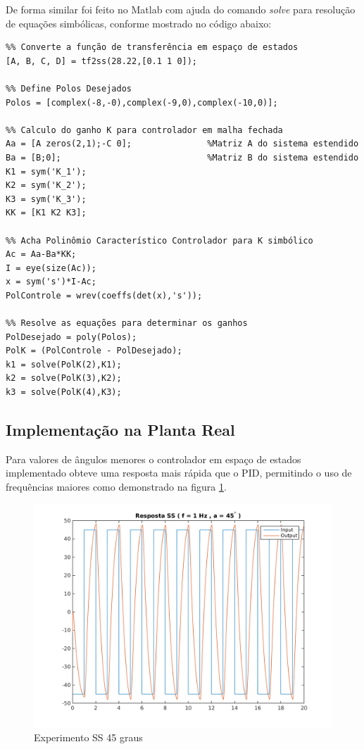 \documentclass[a4paper,11pt]{article}
\begin{document}
De forma similar foi feito no Matlab com ajuda do comando \textit{solve} para resolução de equações simbólicas, conforme mostrado no código abaixo:

\begin{verbatim}
%% Converte a função de transferência em espaço de estados 
[A, B, C, D] = tf2ss(28.22,[0.1 1 0]);

%% Define Polos Desejados
Polos = [complex(-8,-0),complex(-9,0),complex(-10,0)];

%% Calculo do ganho K para controlador em malha fechada 
Aa = [A zeros(2,1);-C 0];               %Matriz A do sistema estendido
Ba = [B;0];                             %Matriz B do sistema estendido
K1 = sym('K_1');
K2 = sym('K_2');
K3 = sym('K_3');
KK = [K1 K2 K3];

%% Acha Polinômio Característico Controlador para K simbólico
Ac = Aa-Ba*KK;
I = eye(size(Ac));
x = sym('s')*I-Ac;
PolControle = wrev(coeffs(det(x),'s'));

%% Resolve as equações para determinar os ganhos
PolDesejado = poly(Polos);
PolK = (PolControle - PolDesejado);
k1 = solve(PolK(2),K1);
k2 = solve(PolK(3),K2);
k3 = solve(PolK(4),K3);
\end{verbatim}

\subsection{Implementação na Planta Real}

Para valores de ângulos menores o controlador em espaço de estados implementado obteve uma resposta mais rápida que o PID, permitindo o uso de frequências maiores como demonstrado na figura \ref{fig:quanserss_s45num1}.

\begin{figure}[H]
    \centering
    \includegraphics[width=0.8\linewidth]{tex/img/quanserss_s45num1.png}
    \caption{Experimento SS 45 graus}
    \label{fig:quanserss_s45num1}
\end{figure}
\end{document}
